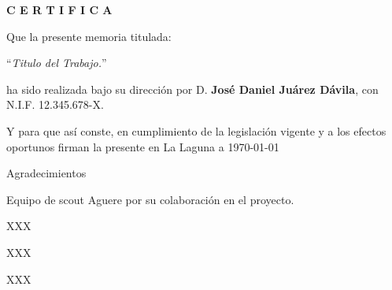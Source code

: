 \documentclass[spanish,a4paper,11pt,twoside]{report}
\begin{document}
\bigskip
\bigskip
\bigskip
\bigskip
\bigskip
{\bf C E R T I F I C A}

\bigskip
\bigskip
\bigskip
Que la presente memoria titulada:

\bigskip
``{\it Titulo del Trabajo.}''

\bigskip
\bigskip
\bigskip

\noindent ha sido realizada bajo su dirección por D. {\bf José Daniel Juárez Dávila},
con N.I.F. 12.345.678-X.

\bigskip
\bigskip

Y para que así conste, en cumplimiento de la legislación vigente y a los efectos
oportunos firman la presente en La Laguna a \today 

\cleardoublepage
\thispagestyle{empty}

{ \flushright

\begin{LARGE}
Agradecimientos
\end{LARGE}

\hspace{3mm}

\begin{large}


\hspace{3mm}
Equipo de scout Aguere por su colaboración en el proyecto.

\hspace{3mm}
XXX


\hspace{3mm}
XXX


\hspace{3mm}
XXX


\end{large}

}
\end{document}
